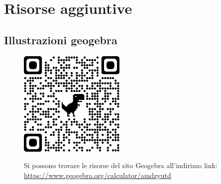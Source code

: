 \documentclass[10pt,a4paper]{article}
\begin{document}
\section{Risorse aggiuntive}

\subsection{Illustrazioni geogebra}

\begin{figure}[h]
	 \includegraphics[width=2in]{qr circonferenza geogebra.png}
	 
	 Si possono trovare le risorse del sito Geogebra all'indirizzo link: \\ \url{https://www.geogebra.org/calculator/amdzyutd}
\end{figure}
\end{document}
